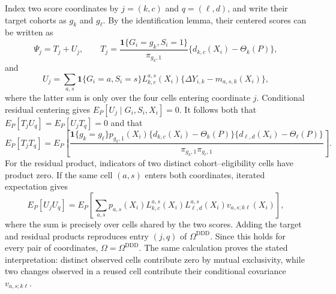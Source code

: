 Index two score coordinates by \(j=(k,c)\) and \(q=(\ell,d)\), and write their target cohorts as \(g_k\) and \(g_\ell\).  By the identification lemma, their centered scores can be written as
\[
 \Psi_j=T_j+U_j,
 \qquad
 T_j=\frac{\mathbf 1\{G_i=g_k,S_i=1\}}{\pi_{g_k,1}}
       \{d_{k,c}(X_i)-\Theta_k(P)\},
\]
and
\[
 U_j=\sum_{a,s}\mathbf 1\{G_i=a,S_i=s\}
 L_{k,c}^{a,s}(X_i)\{\Delta Y_{i,k}-m_{a,s,k}(X_i)\},
\]
where the latter sum is only over the four cells entering coordinate \(j\).  Conditional residual centering gives \(E_P[U_j\mid G_i,S_i,X_i]=0\).  It follows both that \(E_P[T_jU_q]=E_P[U_jT_q]=0\) and that
\[
 E_P[T_jT_q]
 =E_P\!\left[
 \frac{\mathbf 1\{g_k=g_\ell\}p_{g_k,1}(X_i)
 \{d_{k,c}(X_i)-\Theta_k(P)\}
 \{d_{\ell,d}(X_i)-\Theta_\ell(P)\}}
 {\pi_{g_k,1}\pi_{g_\ell,1}}
 \right].
\]
For the residual product, indicators of two distinct cohort--eligibility cells have product zero.  If the same cell \((a,s)\) enters both coordinates, iterated expectation gives
\[
 E_P[U_jU_q]
 =E_P\!\left[
 \sum_{a,s}p_{a,s}(X_i)L_{k,c}^{a,s}(X_i)L_{\ell,d}^{a,s}(X_i)
 v_{a,s;k\ell}(X_i)
 \right],
\]
where the sum is precisely over cells shared by the two scores.  Adding the target and residual products reproduces entry \((j,q)\) of \(\Omega^{\mathrm{DDD}}\).  Since this holds for every pair of coordinates, \(\Omega=\Omega^{\mathrm{DDD}}\).  The same calculation proves the stated interpretation: distinct observed cells contribute zero by mutual exclusivity, while two changes observed in a reused cell contribute their conditional covariance \(v_{a,s;k\ell}\).